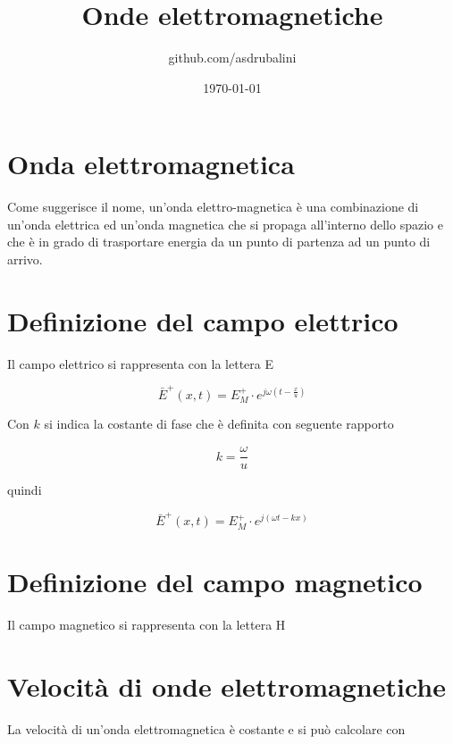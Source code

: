 \documentclass{article}
\title{Onde elettromagnetiche}
\author{github.com/asdrubalini}
\date{\today}
\begin{document}
    \maketitle

    \section{Onda elettromagnetica}

    Come suggerisce il nome, un'onda elettro-magnetica è una combinazione di un'onda elettrica ed un'onda
    magnetica che si propaga all'interno dello spazio e che è in grado di trasportare energia da un punto di
    partenza ad un punto di arrivo.
    
    \section{Definizione del campo elettrico}

    Il campo elettrico si rappresenta con la lettera E

    \begin{equation}
        \bar{E}^+(x, t) = E^+_M \cdot e^{j\omega (t-\frac{x}{u})}
    \end{equation}

    Con $k$ si indica la costante di fase che è definita con seguente rapporto

    \begin{equation}
        k = \frac{\omega}{u}
    \end{equation}

    quindi

    \begin{equation}
        \bar{E}^+(x, t) = E^+_M \cdot e^{j (\omega t - kx)}
    \end{equation}

    \section{Definizione del campo magnetico}

    Il campo magnetico si rappresenta con la lettera H

    \section{Velocità di onde elettromagnetiche}

    La velocità di un'onda elettromagnetica è costante e si può calcolare con
\end{document}
